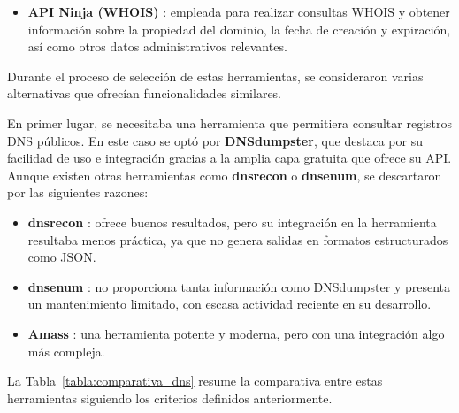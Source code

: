 \begin{parskipenv}
\begin{itemize}
    \item \textbf{API Ninja (WHOIS)} \cite{apininja_whois}: empleada para realizar consultas WHOIS y obtener información sobre la propiedad del dominio, la fecha de creación y expiración, así como otros datos administrativos relevantes.
\end{itemize}

Durante el proceso de selección de estas herramientas, se consideraron varias alternativas que ofrecían funcionalidades similares.

En primer lugar, se necesitaba una herramienta que permitiera consultar registros DNS públicos. En este caso se optó por \textbf{DNSdumpster}, que destaca por su facilidad de uso e integración gracias a la amplia capa gratuita que ofrece su API. Aunque existen otras herramientas como \textbf{dnsrecon} o \textbf{dnsenum}, se descartaron por las siguientes razones:

\begin{itemize}
    \item \textbf{dnsrecon} \cite{dnsrecon}: ofrece buenos resultados, pero su integración en la herramienta resultaba menos práctica, ya que no genera salidas en formatos estructurados como JSON.
    
    \item \textbf{dnsenum} \cite{dnsenum}: no proporciona tanta información como DNSdumpster y presenta un mantenimiento limitado, con escasa actividad reciente en su desarrollo.
    
    \item \textbf{Amass} \cite{amass}: una herramienta potente y moderna, pero con una integración algo más compleja.
\end{itemize}

La Tabla~\ref{tabla:comparativa_dns} resume la comparativa entre estas herramientas siguiendo los criterios definidos anteriormente.

\begin{table}[H]
\centering
\renewcommand{\arraystretch}{1.4}
\caption{Comparativa de herramientas para reconocimiento de registros DNS.}
\label{tabla:comparativa_dns}
\end{table}


\end{parskipenv}

